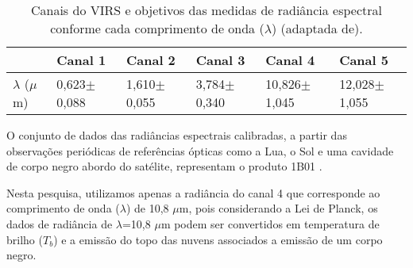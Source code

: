 \begin{table}[!ht]
\caption{Canais do VIRS e objetivos das medidas de radiância espectral conforme cada comprimento de onda ($\lambda$) (adaptada de).}
\label{canaisVirs}
\centering
\small
\newcommand{\grayline}{\rowcolor[gray]{.88}}
\renewcommand {\tabularxcolumn }[1]{ >{\arraybackslash }m{#1}}
\begin{tabularx}{\textwidth}{W W W W W W} %
\hline\hline 
  & Canal 1 & Canal 2 & Canal 3 & Canal 4 & Canal 5\\[1.5pt]
\hline
\grayline $\lambda$ ($\mu$m) & 0,623$\pm$0,088 & 1,610$\pm$0,055 & 3,784$\pm$0,340 & 10,826$\pm$1,045 & 12,028$\pm$1,055 \\[1.5pt]
\hline 
\end{tabularx}
\end{table}

O conjunto de dados das radiâncias espectrais calibradas, a partir das observações periódicas de referências ópticas como a Lua, o Sol e uma cavidade de corpo negro abordo do satélite, representam o produto 1B01 \cite{kummerok1998}.

Nesta pesquisa, utilizamos apenas a radiância do canal 4 que corresponde ao comprimento de onda ($\lambda$) de 10,8 $\mu$m, pois considerando a Lei de Planck, os dados de radiância de $\lambda$=10,8 $\mu$m podem ser convertidos em temperatura de brilho ($T_b$) e a emissão do topo das nuvens associados a emissão de um corpo negro. 





